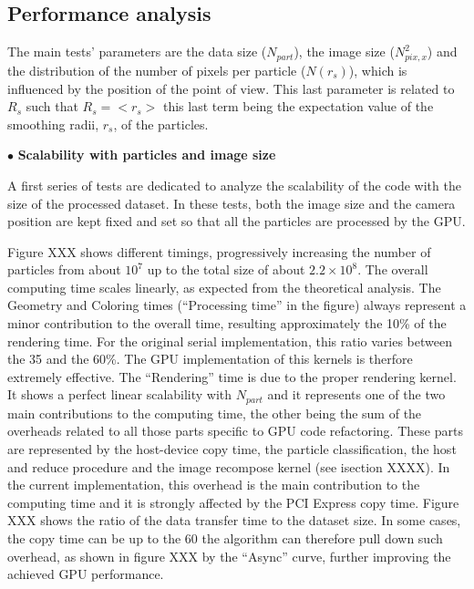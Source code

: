 \documentclass[11pt]{article}
\begin{document}

\subsection{Performance analysis}

The main tests' parameters are the data size ($N_{part}$),
the image size ($N_{pix,x}^2$) and the distribution of the number of pixels 
per particle ($N(r_s)$), which is influenced by the position of the point of view.
This last parameter is related to $R_s$ such that $R_s = <r_s>$ this last term 
being the expectation value of the smoothing radii, $r_s$, of the particles.

\noindent$\bullet$ {\bf Scalability with particles and image size}

A first series of tests are dedicated to analyze the scalability of the code
with the size of the processed dataset. In these tests, both the image size
and the camera position are kept fixed and set so that all the particles are processed 
by the GPU.

Figure XXX shows different timings, progressively increasing the number of particles
from about $10^7$ up to the total size of about $2.2\times 10^8$. 
The overall computing time scales linearly, as expected from the theoretical analysis.
The Geometry and Coloring times (``Processing time'' in the figure) always represent 
a minor contribution to the overall time, resulting approximately the 10\% of the rendering 
time. For the original serial implementation, this ratio varies between the 35 and the 60\%.
The GPU implementation of this kernels is therfore extremely effective. The ``Rendering'' time 
is due to the proper rendering kernel. It shows a perfect linear scalability
with $N_{part}$ and it represents one of the two main contributions
to the computing time, the other being the sum of the overheads related to all those 
parts specific to GPU code refactoring. These parts are represented by 
the host-device copy time, the particle classification, the host and reduce procedure 
and the image recompose kernel (see isection XXXX). 
In the current implementation, this overhead is
the main contribution to the computing time and 
it is strongly affected by the PCI Express copy time. Figure XXX shows the ratio 
of the data transfer time to the dataset size. In some cases, the copy time can be 
up to the 60%
the algorithm can therefore pull down such overhead, as shown in figure XXX by
the ``Async'' curve, further improving the achieved GPU performance.  
 
\end{document}
